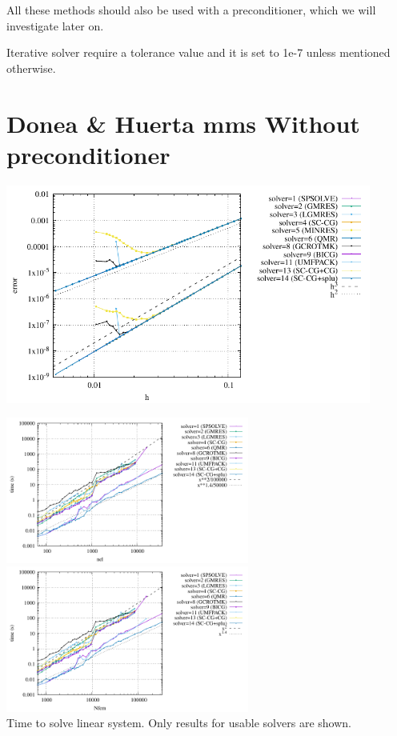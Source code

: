 All these methods should also be used with a preconditioner, which we will 
investigate later on.

Iterative solver require a tolerance value and it is set to 1e-7 unless mentioned
otherwise.

\newpage
\section*{Donea \& Huerta mms Without preconditioner}

\begin{center}
\includegraphics[width=12cm]{python_codes/fieldstone_147/RESULTS/errors.pdf}
\end{center}

\begin{center}
\includegraphics[width=8cm]{python_codes/fieldstone_147/RESULTS/solve.pdf}
\includegraphics[width=8cm]{python_codes/fieldstone_147/RESULTS/solve2.pdf}\\
{\captionfont Time to solve linear system. Only results for usable solvers are shown.}
\end{center}

